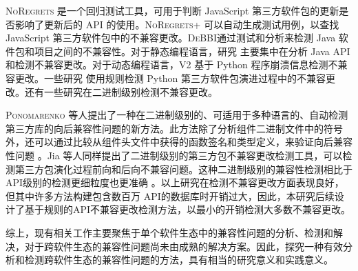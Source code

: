 \textsc{NoRegrets} 是一个回归测试工具，可用于判断 JavaScript 第三方软件包的更新是否影响了更新后的 API 的使用。\textsc{NoRegrets+} 可以自动生成测试用例，以查找 JavaScript 第三方软件包中的不兼容更改。\textsc{DeBBI}通过测试和分析来检测 Java 软件包和项目之间的不兼容性。对于静态编程语言，研究 主要集中在分析 Java API 和检测不兼容更改。对于动态编程语言，\textsc{V2}  基于 Python 程序崩溃信息检测不兼容更改。一些研究 使用规则检测 Python 第三方软件包演进过程中的不兼容更改。还有一些研究在二进制级别检测不兼容更改。

\textsc{Ponomarenko} 等人提出了一种在二进制级别的、可适用于多种语言的、自动检测第三方库的向后兼容性问题的新方法。此方法除了分析组件二进制文件中的符号外，还可以通过比较从组件头文件中获得的函数签名和类型定义，来验证向后兼容性问题 。Jia 等人同样提出了二进制级别的第三方包不兼容更改检测工具，可以检测第三方包演化过程前向和后向不兼容问题。这种二进制级别的兼容性检测相比于API级别的检测更细粒度也更准确 。以上研究在检测不兼容更改方面表现良好，但其中许多方法构建包含数百万 API的数据库时开销过大，因此，本研究后续设计了基于规则的API不兼容更改检测方法，以最小的开销检测大多数不兼容更改。

综上，现有相关工作主要聚焦于单个软件生态中的兼容性问题的分析、检测和解决，对于跨软件生态的兼容性问题尚未由成熟的解决方案。因此，探究一种有效分析和检测跨软件生态的兼容性问题的方法，具有相当的研究意义和实践意义。


